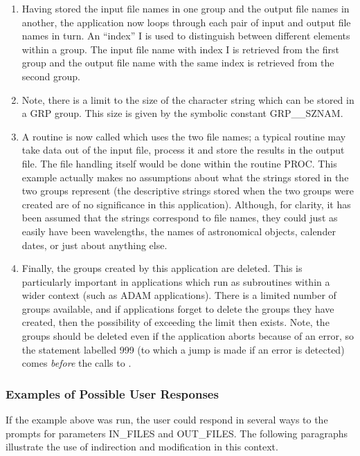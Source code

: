 \begin{enumerate}
\item Having stored the input file names in one group and the output file names
in another, the application now loops through each pair of input and output file
names in turn. An ``index'' I is used to distinguish between different
elements within a group. The input file name with index I is retrieved from the
first group and the output file name with the same index is retrieved from the
second group.

\item Note, there is a limit to the size of the character string which can be
stored in a GRP group. This size is given by the symbolic constant GRP\_\_SZNAM.

\item A routine is now called which uses the two file names; a typical routine
may take data out of the input file, process it and store the results in the
output file. The file handling itself would be done within the routine PROC.
This example actually makes no assumptions about what the strings stored in the
two groups represent (the descriptive strings stored when the two groups were
created are of no significance in this application). Although, for clarity, it
has been assumed that the strings correspond to file names, they could just as
easily have been wavelengths, the names of astronomical objects, calender dates,
or just about anything else.

\item Finally, the groups created by this application are deleted. This is
particularly important in applications which run as subroutines within a wider
context (such as ADAM applications). There is a limited number of groups
available, and if applications forget to delete the groups they have created,
then the possibility of exceeding the limit then exists. Note, the groups should
be deleted even if the application aborts because of an error, so the statement
labelled 999 (to which a jump is made if an error is detected) comes {\em
before} the calls to .

\end{enumerate}

\subsubsection{Examples of Possible User Responses}
If the example above was run, the user could respond in several ways to the
prompts for parameters IN\_FILES and OUT\_FILES. The following paragraphs
illustrate the use of indirection and modification in this context.

